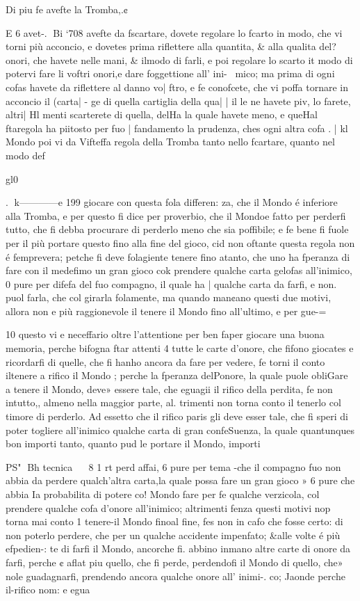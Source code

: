 \documentclass[11pt,a6paper]{article}
\begin{document}
Di piu fe avefte la Tromba,.¢

E 6 avet-.
Bi ‘708
avefte da fscartare, dovete regolare lo fcarto in modo, che vi
torni più acconcio, e dovetes
prima riflettere alla quantita, &
alla qualita del?onori, che havete nelle mani, & ilmodo di
farli, e poi regolare lo scarto it
modo di potervi fare li voftri
onori,e dare foggettione all’ ini-~
mico; ma prima di ogni cofas
havete da riflettere al danno vo| ftro, e fe conofcete, che vi poffa tornare in acconcio il (carta| - ge di quella cartiglia della qua| | il le ne havete piv, lo farete, altri| Hl menti scarterete di quella, delHa la quale havete meno, e queHal ftaregola ha piitosto per fuo
| fandamento la prudenza, ches
ogni altra cofa .
| kl Mondo poi vi da Vifteffa regola della Tromba tanto nello
fcartare, quanto nel modo def

gl0~

.
k————e
199
giocare con questa fola differen:
za, che il Mondo é inferiore alla Tromba, e per questo fi dice
per proverbio, che il Mondoe
fatto per perderfi tutto, che fi
debba procurare di perderlo
meno che sia poffibile; e fe bene
fi fuole per il più portare questo
fino alla fine del gioco, cid non
oftante questa regola non é femprevera; petche fi deve folagiente tenere fino atanto, che
uno ha fperanza di fare con il
medefimo un gran gioco cok
prendere qualche carta gelofas
all’inimico, 0 pure per difefa
del fuo compagno, il quale ha
| qualche carta da farfi, e non.
puol farla, che col girarla folamente, ma quando man¢ano
questi due motivi, allora non e
più raggionevole il tenere il
Mondo fino all’ultimo, e per
gue-=

 
 

10
questo vi e neceffario oltre l’attentione per ben faper giocare
una buona memoria, perche bifogna ftar attenti 4 tutte le carte d’onore, che fifono giocates
e ricordarfi di quelle, che fi hanho ancora da fare per vedere,
fe torni il conto iltenere a rifico il Mondo ; perche la fperanza
delPonore, la quale puole obliGare a tenere il Mondo, deve»
essere tale, che eguagii il rifico
della perdita, fe non intutto,,
almeno nella maggior parte, al.
trimenti non torna conto il tenerlo col timore di perderlo.
Ad essetto che il rifico paris
gli deve esser tale, che fi speri
di poter togliere all’inimico
qualche carta di gran confeSuenza, la quale quantunques
bon importi tanto, quanto pud
le portare il Mondo, importi

PS"
Bh tecnica
~~ 8 1 rt
perd affai, 6 pure per tema
-che il compagno fuo non abbia
da perdere qualch’altra carta,la
quale possa fare un gran gioco »
6 pure che abbia Ia probabilita
di potere co! Mondo fare per fe
qualche verzicola, col prendere
qualche cofa d’onore all’inimico; altrimenti fenza questi motivi nop torna mai conto 1 tenere-il Mondo finoal fine, fes
non in cafo che fosse certo: di
non poterlo perdere, che per
un qualche accidente impenfato; &alle volte é più efpedien-:
te di farfi il Mondo, ancorche fi.
abbino inmano altre carte di
onore da farfi, perche ¢ aflat
piu quello, che fi perde, perdendofi il Mondo di quello, che»
nole guadagnarfi, prendendo
ancora qualche onore all’ inimi-.
co; Jaonde perche il-rifico nom:
e egua 
\end{document}
